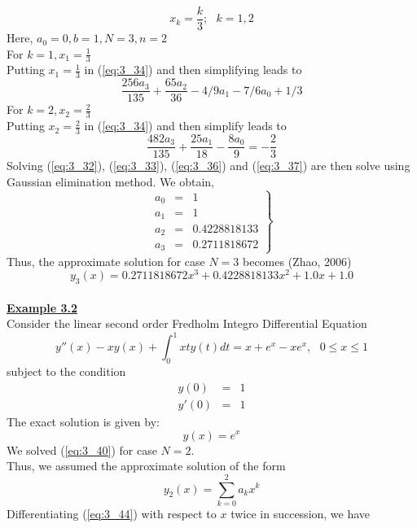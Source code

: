 \documentclass[12pt]{report}
\newcommand{\ubt}[1]{\textbf{\underline{#1}}}
\newcommand{\sps}{\\[0.2cm]}
\newcommand{\refn}[1]{(\ref{#1})}
\newcommand{\IDE}{Integro Differential Equation}
\newcommand{\sprime}{'}
\newcommand{\dprime}{''}
\newcommand{\NI}{\noindent}
\begin{document}
	\begin{equation*}
		x_k = \frac{k}{3}; ~~~ k=1,2
	\end{equation*}
	Here, $a_0=0, b=1, N=3, n=2$\sps
	For $k=1, x_1 = \frac{1}{3}$\sps
	Putting $x_1 = \frac{1}{3}$ in \refn{eq:3_34} and then simplifying leads to 
	\begin{equation}
		\frac{256a_3}{135} + \frac{65a_2}{36} - 4/9a_1 - 7/6a_0 + 1/3 \label{eq:3_36}
	\end{equation}
	For $k=2, x_2 = \frac{2}{3}$\sps
	Putting $x_2 = \frac{2}{3}$ in \refn{eq:3_34} and then simplify leads to 
	\begin{equation}
		\frac{482a_3}{135} + \frac{25a_1}{18} - \frac{8a_0}{9} = -\frac{2}{3} \label{eq:3_37}
	\end{equation}
	Solving \refn{eq:3_32}, \refn{eq:3_33}, \refn{eq:3_36} and \refn{eq:3_37} are then solve using Gaussian elimination method. We obtain,
	\begin{equation}
		\left. 
			\begin{array}{rcl}
				a_0 &=& 1\sps
				a_1 &=& 1 \sps
				a_2 &=& 0.4228818133\sps
				a_3 &=& 0.2711818672
			\end{array}
		\right\}
		\label{eq:3_38}
	\end{equation}
	Thus, the approximate solution for case $N=3$ becomes (Zhao, 2006)
	\begin{equation}
		y_3(x) = 0.2711818672x^3 + 0.4228818133x^2 + 1.0x + 1.0 \label{eq:3_39}
	\end{equation}
	\sps
	\NI\ubt{Example 3.2}\sps
	Consider the linear second order Fredholm \IDE
	\begin{equation}
		y\dprime(x) - xy(x) + \int_{0}^{1}xty(t)dt = x + e^x - xe^x, ~~~ 0 \leq x \leq 1 \label{eq:3_40}
	\end{equation}
	subject to the condition
	\begin{eqnarray}
		y(0) &=& 1 \label{eq:3_41}\sps
		y\sprime(0) &=& 1 \label{eq:3_42}
	\end{eqnarray}
	The exact solution is given by:
	\begin{equation}
		y(x) = e^x \label{eq:3_43}
	\end{equation}
	We solved \refn{eq:3_40} for case $N=2$.\\
	Thus, we assumed the approximate solution of the form 
	\begin{equation}
		y_2(x) = \sum_{k=0}^{2}a_kx^k \label{eq:3_44}
	\end{equation}
	Differentiating \refn{eq:3_44} with respect to $x$ twice in succession, we have
\end{document}
